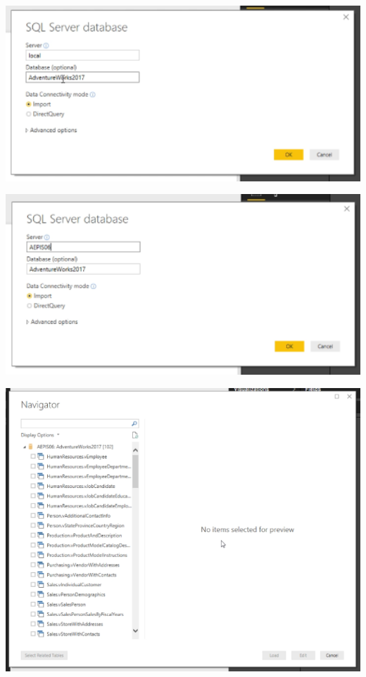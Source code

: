 	\begin{center}
	\includegraphics[width=17cm]{./Imagenes/3}
	\end{center}

	\begin{center}
	\includegraphics[width=17cm]{./Imagenes/4}
	\end{center}

	\begin{center}
	\includegraphics[width=17cm]{./Imagenes/5}
	\end{center}